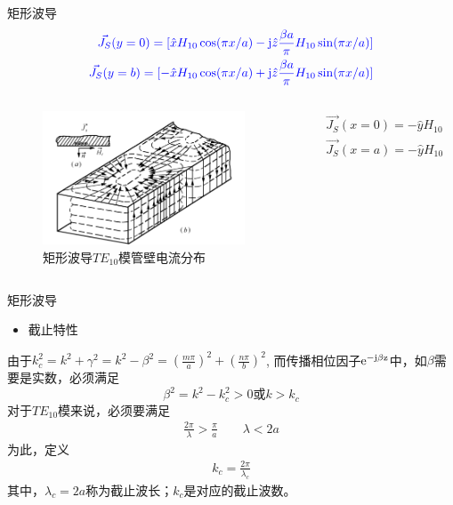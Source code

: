 \begin{frame}{矩形波导}
    \begin{align*}
        \color{blue}{\vec{J_S}(y=0)=[\hat{x}H_{10}\cos(\pi x/a)-\mathrm{j}\hat{z}\frac{\beta a}{\pi}H_{10}\sin(\pi x/a)]}\\
        \color{blue}{\vec{J_S}(y=b)=[-\hat{x}H_{10}\cos(\pi x/a)+\mathrm{j}\hat{z}\frac{\beta a}{\pi}H_{10}\sin(\pi x/a)]}
    \end{align*}
    \begin{columns}
        \begin{column}{0.5\linewidth}
            \begin{figure}
                \includegraphics[width=6cm]{Cha6//fig6-6.png}
                \caption{矩形波导$TE_{10}$模管壁电流分布}
            \end{figure}
        \end{column}
        \begin{column}{0.5\linewidth}
            \begin{align*}
                \vec{J_S}(x=0)=-\hat{y}H_{10}\\
                \vec{J_S}(x=a)=-\hat{y}H_{10}
            \end{align*}
        \end{column}
    \end{columns}
\end{frame}

\begin{frame}{矩形波导}
    \begin{itemize}
        \item 截止特性
    \end{itemize}
    由于$k_c^2=k^2+\gamma^2=k^2-\beta^2=\left(\frac{m\pi}{a}\right)^2+\left(\frac{n\pi}{b}\right)^2$,
    而传播相位因子$\rm{e}^{-\rm{j}\beta z}$中，如$\beta$需要是实数，必须满足
    $$\beta^2=k^2-k_c^2>0或k>k_c$$
    对于$TE_{10}$模来说，必须要满足
    \begin{align}
        \frac{2\pi}{\lambda}>\frac{\pi}{a}\qquad \lambda<2a
    \end{align}
    为此，定义
    \begin{align}
        k_c=\frac{2\pi}{\lambda_c}
    \end{align}
    其中，$\lambda_c=2a$称为截止波长；$k_c$是对应的截止波数。
\end{frame}

